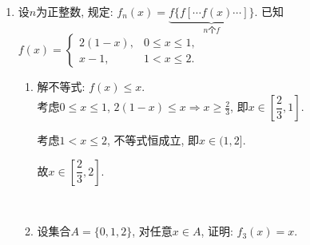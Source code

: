\documentclass[8pt]{article}
\begin{document}
\begin{enumerate}[label=\arabic*.]
\begin{enumerate}[label=(\arabic*)]
					$$
					\begin{tikzpicture}[scale=1]
			    		\draw[black, ->] (-1,  0)--( 5,  0) node[below] {$x$};
			    		\draw[black, ->] ( 0, -1)--( 0, 3) node[right] {$y$} node at (0, 0) [anchor=north east] {$O$};
    					\foreach \x/\xtext in {1/1, 2/2, 3/3, 4/4}{
    						\draw (\x, -0.05) -- (\x, 0.05) node[below] {\xtext};
    					}
    					\foreach \y/\ytext in {0.5/0.5, 1/1, 1.5/1.5, 2/2}{
    						\draw (-0.05, \y) -- (0.05, \y) node[left] {\ytext};
    					}
			    		\draw[black, domain=0:1/16] plot(\x, {1/2 - 2 * (\x^(1/2))});
			    		\draw[black, domain=1/16:1] plot(\x, {2 * (\x^(1/2)) - (1/2)});
			    		\draw[black] (1, 1.5) circle (0.05);
			    		\filldraw[black] (1, 0.5) circle (0.05);
			    		\draw[black, domain=1:2] plot(\x, {(1/\x) - (1/2)});
			    		\draw[black, domain=2:4] plot(\x, {(1/2) - (1/\x)});
			    		\draw[black, dashed] (0, 1.5)--(1, 1.5);
			    		\draw[black, dashed] (0, 0.5)--(1, 0.5);
			    		\draw[black, dashed] (0, 0.25)--(4, 0.25) node[above] {$y=0.25$};
			    	\end{tikzpicture}
					$$

					故有$t\in\left(\dfrac{1}{4}, \dfrac{1}{2}\right].$

			\end{enumerate}

		~\\

		\item 设$n$为正整数, 规定: $\displaystyle f_n (x) = \underbrace{f\{f[\cdots f(x)\cdots]\}}_{n\text{个}f}$. 已知$f(x)=\left\{\begin{array}{rl}2(1-x), &0\leq x\leq 1,\\x-1, &1<x\leq 2.\end{array}\right.$
			\begin{enumerate}[label=(\arabic*)]
				\item 解不等式: $f(x)\leq x$.
					~\\

					考虑$0\leq x\leq 1$, $2(1-x)\leq x \Rightarrow x\geq \frac{2}{3}$, 即$x\in\left[\dfrac{2}{3}, 1\right]$.

					考虑$1 < x \leq 2$, 不等式恒成立, 即$x\in(1, 2]$.

					故$x\in\left[\dfrac{2}{3}, 2\right]$.

				~\\

				\item 设集合$A=\{0, 1, 2\}$, 对任意$x\in A$, 证明: $f_3(x)=x$.
					~\\


\end{enumerate}
\end{enumerate}
\end{document}
